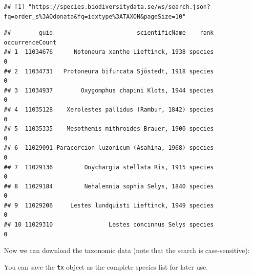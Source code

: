 \documentclass[
  10pt,
]{article}
\newenvironment{Shaded}{\begin{snugshade}}{\end{snugshade}}
\newcommand{\AttributeTok}[1]{\textcolor[rgb]{0.77,0.63,0.00}{#1}}
\newcommand{\ConstantTok}[1]{\textcolor[rgb]{0.00,0.00,0.00}{#1}}
\newcommand{\DocumentationTok}[1]{\textcolor[rgb]{0.56,0.35,0.01}{\textbf{\textit{#1}}}}
\newcommand{\FunctionTok}[1]{\textcolor[rgb]{0.00,0.00,0.00}{#1}}
\newcommand{\NormalTok}[1]{#1}
\newcommand{\OtherTok}[1]{\textcolor[rgb]{0.56,0.35,0.01}{#1}}
\newcommand{\SpecialCharTok}[1]{\textcolor[rgb]{0.00,0.00,0.00}{#1}}
\newcommand{\StringTok}[1]{\textcolor[rgb]{0.31,0.60,0.02}{#1}}
\begin{document}
\begin{verbatim}
## [1] "https://species.biodiversitydata.se/ws/search.json?fq=order_s%3AOdonata&fq=idxtype%3ATAXON&pageSize=10"
\end{verbatim}

\begin{verbatim}
##        guid                        scientificName    rank occurrenceCount
## 1  11034676      Notoneura xanthe Lieftinck, 1938 species               0
## 2  11034731   Protoneura bifurcata Sjöstedt, 1918 species               0
## 3  11034937        Oxygomphus chapini Klots, 1944 species               0
## 4  11035128    Xerolestes pallidus (Rambur, 1842) species               0
## 5  11035335    Mesothemis mithroides Brauer, 1900 species               0
## 6  11029091 Paracercion luzonicum (Asahina, 1968) species               0
## 7  11029136         Onychargia stellata Ris, 1915 species               0
## 8  11029184         Nehalennia sophia Selys, 1840 species               0
## 9  11029206     Lestes lundquisti Lieftinck, 1949 species               0
## 10 11029310                Lestes concinnus Selys species               0
\end{verbatim}

Now we can download the taxonomic data (note that the search is
case-sensitive):

\begin{Shaded}
\end{Shaded}

You can save the \texttt{tx} object as the complete species list for later use.
\end{document}
